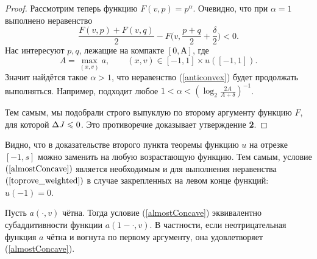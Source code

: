 \begin{proof}
Рассмотрим теперь функцию $F(v, p) = p^\alpha$.
Очевидно, что при $\alpha = 1$ выполнено неравенство
\begin{equation}
\label{anticonvex}
\frac{F(v, p) + F(v, q)}{ 2 } - F \bigl( v, \frac{p + q}{ 2 } + \frac{\delta}{ 2 } \bigr) < 0.
\end{equation}
Нас интересуют $p, q$, лежащие на компакте $[0, А]$, где
\begin{equation*}
A = \max \limits_{(x, v)} a, \qquad (x, v) \in [-1, 1 ] \times u([-1, 1] ).
\end{equation*}
Значит найдётся такое $\alpha > 1$, что неравенство (\ref{anticonvex}) будет продолжать выполняться.
Например, подходит любое $1 < \alpha < ( \log_2 \frac{2 A}{A + \delta} )^{-1}$.

Тем самым, мы подобрали строго выпуклую по второму аргументу функцию $F$, для которой $\Delta J \leqslant 0$.
Это противоречие доказывает утверждение \textbf{2}.
\end{proof}

\begin{rem}
\label{landesNecessaryRem}
Видно, что в доказательстве второго пункта теоремы
функцию $u$ на отрезке $[-1, s]$ можно заменить на любую возрастающую функцию.
Тем самым, условие $(\ref{almostConcave})$ является необходимым и для выполнения неравенства $(\ref{toprove_weighted})$
в случае закрепленных на левом конце функций: $u( -1 ) = 0$.
\end{rem}

\begin{rem}
Пусть $a(\cdot, v)$ чётна.
Тогда условие (\ref{almostConcave}) эквивалентно субаддитивности функции $a(1 - \cdot, v)$.
В частности, если неотрицательная функция $a$ чётна и вогнута по первому аргументу, она удовлетворяет (\ref{almostConcave}).
\end{rem}
